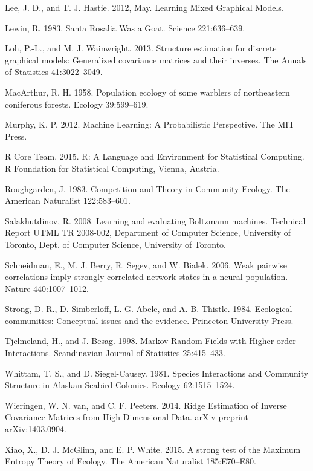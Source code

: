 \documentclass[12pt,]{article}
\begin{document}
\begin{spacing}{1.9}
\begin{flushleft}
Lee, J. D., and T. J. Hastie. 2012, May. Learning Mixed Graphical
Models.

Lewin, R. 1983. Santa Rosalia Was a Goat. Science 221:636--639.

Loh, P.-L., and M. J. Wainwright. 2013. Structure estimation for
discrete graphical models: Generalized covariance matrices and their
inverses. The Annals of Statistics 41:3022--3049.

MacArthur, R. H. 1958. Population ecology of some warblers of
northeastern coniferous forests. Ecology 39:599--619.

Murphy, K. P. 2012. Machine Learning: A Probabilistic Perspective. The
MIT Press.

R Core Team. 2015. R: A Language and Environment for Statistical
Computing. R Foundation for Statistical Computing, Vienna, Austria.

Roughgarden, J. 1983. Competition and Theory in Community Ecology. The
American Naturalist 122:583--601.

Salakhutdinov, R. 2008. Learning and evaluating Boltzmann machines.
Technical Report UTML TR 2008-002, Department of Computer Science,
University of Toronto, Dept. of Computer Science, University of Toronto.

Schneidman, E., M. J. Berry, R. Segev, and W. Bialek. 2006. Weak
pairwise correlations imply strongly correlated network states in a
neural population. Nature 440:1007--1012.

Strong, D. R., D. Simberloff, L. G. Abele, and A. B. Thistle. 1984.
Ecological communities: Conceptual issues and the evidence. Princeton
University Press.

Tjelmeland, H., and J. Besag. 1998. Markov Random Fields with
Higher-order Interactions. Scandinavian Journal of Statistics
25:415--433.

Whittam, T. S., and D. Siegel-Causey. 1981. Species Interactions and
Community Structure in Alaskan Seabird Colonies. Ecology 62:1515--1524.

Wieringen, W. N. van, and C. F. Peeters. 2014. Ridge Estimation of
Inverse Covariance Matrices from High-Dimensional Data. arXiv preprint
arXiv:1403.0904.

Xiao, X., D. J. McGlinn, and E. P. White. 2015. A strong test of the
Maximum Entropy Theory of Ecology. The American Naturalist 185:E70--E80.
\end{flushleft}
\end{spacing}
\end{document}
